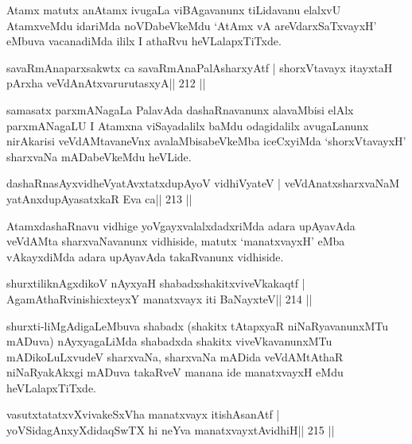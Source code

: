 \begin{artha}
Atamx matutx anAtamx ivugaLa viBAgavanunx tiLidavanu elalxvU AtamxveMdu idariMda noVDabeVkeMdu `AtAmx vA areVdarxSaTxvayxH' eMbuva vacanadiMda ililx I athaRvu heVLalapxTiTxde.
\end{artha}


\begin{shl}
savaRmAnaparxsakwtx ca savaRmAnaPalAsharxyAtf |
shorxVtavayx itayxtaH pArxha veVdAnAtxvarurutasxyA\hfill || 212 ||
\end{shl}

\begin{artha}
samasatx parxmANagaLa PalavAda dashaRnavanunx alavaMbisi elAlx parxmANagaLU I Atamxna viSayadalilx baMdu odagidalilx avugaLanunx nirAkarisi veVdAMtavaneVnx avalaMbisabeVkeMba iceCxyiMda `shorxVtavayxH' sharxvaNa mADabeVkeMdu heVLide.
\end{artha}

\begin{shl}
dashaRnasAyxvidheVyatAvxtatxdupAyoV vidhiVyateV |
veVdAnatxsharxvaNaM yatAnxdupAyasatxkaR Eva ca\hfill || 213 ||
\end{shl}

\begin{artha}
AtamxdashaRnavu vidhige yoVgayxvalalxdadxriMda adara upAyavAda veVdAMta sharxvaNavanunx vidhiside, matutx `manatxvayxH' eMba vAkayxdiMda adara upAyavAda takaRvanunx vidhiside.
\end{artha}


\begin{shl}
shurxtiliknAgxdikoV nAyxyaH shabadxshakitxviveVkakaqtf |
AgamAthaRvinishicxteyxY manatxvayx iti BaNayxteV\hfill || 214 ||
\end{shl}

\begin{artha}
shurxti-liMgAdigaLeMbuva shabadx (shakitx tAtapxyaR niNaRyavanunxMTu mADuva) nAyxyagaLiMda shabadxda shakitx viveVkavanunxMTu mADikoLuLxvudeV sharxvaNa, sharxvaNa mADida veVdAMtAthaR niNaRyakAkxgi mADuva takaRveV manana ide manatxvayxH eMdu heVLalapxTiTxde.
\end{artha}


\begin{shl}
vasutxtatatxvXvivakeSxVha manatxvayx itishAsanAtf |
yoVSidagAnxyXdidaqSwTX hi neYva manatxvayxtAvidhiH\hfill || 215 ||
\end{shl}

